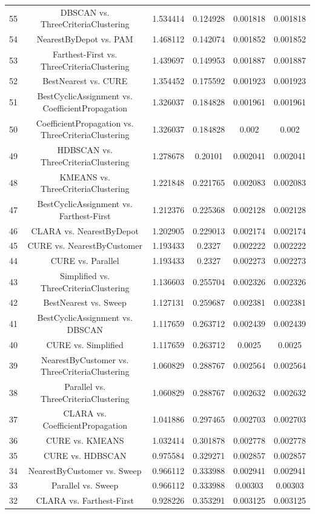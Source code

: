\documentclass[a4paper,10pt]{article}
\begin{document}
\begin{landscape}
\begin{table}[!htp]
\begin{tabular}{cccccc}
55&DBSCAN vs. ThreeCriteriaClustering&1.534414&0.124928&0.001818&0.001818\\
54&NearestByDepot vs. PAM&1.468112&0.142074&0.001852&0.001852\\
53&Farthest-First vs. ThreeCriteriaClustering&1.439697&0.149953&0.001887&0.001887\\
52&BestNearest vs. CURE&1.354452&0.175592&0.001923&0.001923\\
51&BestCyclicAssignment vs. CoefficientPropagation&1.326037&0.184828&0.001961&0.001961\\
50&CoefficientPropagation vs. ThreeCriteriaClustering&1.326037&0.184828&0.002&0.002\\
49&HDBSCAN vs. ThreeCriteriaClustering&1.278678&0.20101&0.002041&0.002041\\
48&KMEANS vs. ThreeCriteriaClustering&1.221848&0.221765&0.002083&0.002083\\
47&BestCyclicAssignment vs. Farthest-First&1.212376&0.225368&0.002128&0.002128\\
46&CLARA vs. NearestByDepot&1.202905&0.229013&0.002174&0.002174\\
45&CURE vs. NearestByCustomer&1.193433&0.2327&0.002222&0.002222\\
44&CURE vs. Parallel&1.193433&0.2327&0.002273&0.002273\\
43&Simplified vs. ThreeCriteriaClustering&1.136603&0.255704&0.002326&0.002326\\
42&BestNearest vs. Sweep&1.127131&0.259687&0.002381&0.002381\\
41&BestCyclicAssignment vs. DBSCAN&1.117659&0.263712&0.002439&0.002439\\
40&CURE vs. Simplified&1.117659&0.263712&0.0025&0.0025\\
39&NearestByCustomer vs. ThreeCriteriaClustering&1.060829&0.288767&0.002564&0.002564\\
38&Parallel vs. ThreeCriteriaClustering&1.060829&0.288767&0.002632&0.002632\\
37&CLARA vs. CoefficientPropagation&1.041886&0.297465&0.002703&0.002703\\
36&CURE vs. KMEANS&1.032414&0.301878&0.002778&0.002778\\
35&CURE vs. HDBSCAN&0.975584&0.329271&0.002857&0.002857\\
34&NearestByCustomer vs. Sweep&0.966112&0.333988&0.002941&0.002941\\
33&Parallel vs. Sweep&0.966112&0.333988&0.00303&0.00303\\
32&CLARA vs. Farthest-First&0.928226&0.353291&0.003125&0.003125\\

\end{tabular}
\end{table}
\end{landscape}
\end{document}
